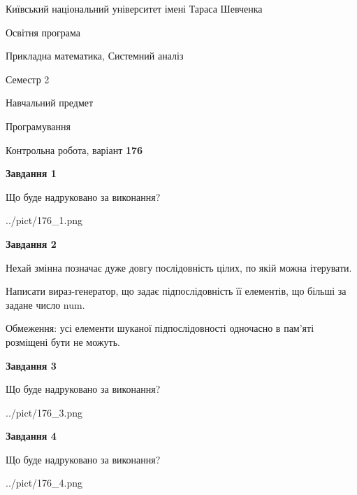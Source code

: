 \documentclass[12pt, ukrainian]{article}
\begin{document}
{{\begin {small}\par
{ \center  Київський національний університет імені Тараса Шевченка \par}
{\parbox {5 cm}{Освітня програма \hfill}{\parbox {8 cm}{Прикладна математика, Системний аналіз \hfill}}\parbox {5 cm}{\hfill Семестр 2}}\par
{\parbox {5 cm} {Навчальний предмет \hfill}\parbox {7 cm}{Програмування \hfill}\parbox {6cm}{\hfill}\par}\vspace{-7pt} \end{small}}{\center Контрольна робота, варіант  \No \textbf
{ 176 }\par}}
{
\begin {large}
{\begin {center}\textbf{Завдання 1}\end {center}}\par
Що буде надруковано за виконання?\par\par
\begin{center}
	{../pict/176_1.png}
\end{center}
\newpage

{\begin {center}\textbf{Завдання 2}\end {center}}\par
Нехай змінна  позначає дуже довгу послідовність цілих, по якій можна ітерувати.

Написати вираз-генератор, що задає підпослідовність її елементів, що більші за задане число num.

Обмеження: усі елементи шуканої підпослідовності одночасно в пам'яті розміщені бути не можуть.\par
\newpage

{\begin {center}\textbf{Завдання 3}\end {center}}\par
Що буде надруковано за виконання?\par
\begin{center}
	{../pict/176_3.png}
\end{center}
\newpage

{\begin {center}\textbf{Завдання 4}\end {center}}\par
Що буде надруковано за виконання?\par
\begin{center}
	{../pict/176_4.png}
\end{center}
\newpage


\end{large}}
\end{document}
